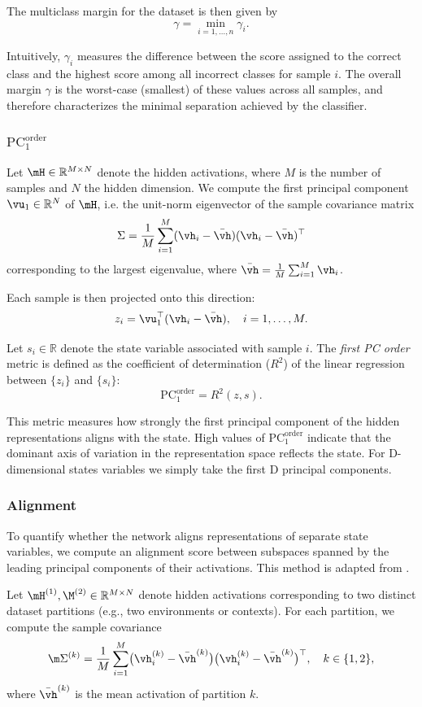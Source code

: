 \documentclass{article}
\begin{document}
The multiclass margin for the dataset is then given by
\[
\gamma = \min_{i=1,\dots,n} \gamma_i.
\]

\noindent
Intuitively, $\gamma_i$ measures the difference between the score assigned to the correct class and the highest score among all incorrect classes for sample $i$. The overall margin $\gamma$ is the worst-case (smallest) of these values across all samples, and therefore characterizes the minimal separation achieved by the classifier.

\subsubsection{$\mathrm{PC}_1^{\text{order}}$}
Let $\mH \in \mathbb{R}^{M \times N}$ denote the hidden activations, where $M$ is the number of samples and $N$ the hidden dimension.  
We compute the first principal component $\vu_1 \in \mathbb{R}^N$ of $\mH$, i.e. the unit-norm eigenvector of the sample covariance matrix
\[
\Sigma = \frac{1}{M} \sum_{i=1}^M (\vh_i - \bar{\vh})(\vh_i - \bar{\vh})^\top
\]
corresponding to the largest eigenvalue, where $\bar{\vh} = \frac{1}{M} \sum_{i=1}^M \vh_i$.

Each sample is then projected onto this direction:
\[
z_i = \vu_1^\top (\vh_i - \bar{\vh}), \quad i = 1, \dots, M.
\]

Let $s_i \in \mathbb{R}$ denote the state variable associated with sample $i$.  
The \emph{first PC order} metric is defined as the coefficient of determination ($R^2$) of the linear regression between $\{z_i\}$ and $\{s_i\}$:
\[
\mathrm{PC}_1^{\text{order}} = R^2(z, s).
\]

\noindent
This metric measures how strongly the first principal component of the hidden representations aligns with the state. High values of $\mathrm{PC}_1^{\text{order}}$ indicate that the dominant axis of variation in the representation space reflects the state. For D-dimensional states variables we simply take the first D principal components.

\subsubsection{Alignment}
To quantify whether the network aligns representations of separate state variables, we compute an alignment score between subspaces spanned by the leading principal components of their activations. This method is adapted from \citet{sorscher2022neural}.

Let $\mH^{(1)}, \M^{(2)} \in \mathbb{R}^{M \times N}$ denote hidden activations corresponding to two distinct dataset partitions (e.g., two environments or contexts).  
For each partition, we compute the sample covariance
\[
\m\Sigma^{(k)} = \frac{1}{M} \sum_{i=1}^M \bigl(\vh^{(k)}_i - \bar{\vh}^{(k)}\bigr)\bigl(\vh^{(k)}_i - \bar{\vh}^{(k)}\bigr)^\top, 
\quad k \in \{1,2\},
\]
where $\bar{\vh}^{(k)}$ is the mean activation of partition $k$.
\end{document}
